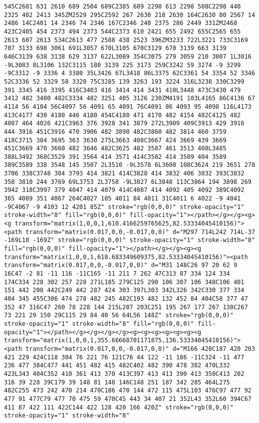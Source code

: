 \documentclass[
]{article}
\begin{document}
\begin{verbatim}
545C2681 631 2610 689 2504 689C2385 689 2298 613 2298 508C2298 440 2325 402 2413 345ZM2529 295C2592 267 2630 218 2630 164C2630 80 2567 14 2486 14C2401 14 2346 74 2346 167C2346 240 2375 286 2449 331ZM2468 423C2405 454 2373 494 2373 544C2373 610 2421 655 2492 655C2565 655 2613 607 2613 534C2613 477 2588 438 2523 396ZM3233 722L3221 733C3169 707 3133 698 3061 691L3057 670L3105 670C3129 670 3139 663 3139 646C3139 638 3138 629 3137 622L3089 354C3075 279 3059 210 3007 1L3016 -9L3083 8L3106 132C3115 180 3139 225 3173 259C3242 59 3274 -9 3299 -9C3312 -9 3336 4 3380 35L3426 67L3418 86L3375 62C3361 54 3354 52 3346 52C3336 52 3329 58 3320 75C3285 139 3263 193 3224 316L3238 330C3299 391 3345 416 3395 416C3403 416 3414 414 3431 410L3448 473C3430 479 3412 482 3400 482C3334 482 3251 405 3126 230ZM4191 103L4165 86C4136 67 4114 56 4104 56C4097 56 4091 65 4091 76C4091 86 4093 95 4098 116L4173 413C4177 430 4180 446 4180 454C4180 471 4170 482 4154 482C4125 482 4087 464 4026 421C3963 376 3928 341 3879 272L3909 409C3913 429 3916 444 3916 451C3916 470 3906 482 3890 482C3860 482 3814 460 3759 418C3715 384 3695 363 3630 275L3663 408C3667 424 3669 439 3669 451C3669 470 3660 482 3646 482C3625 482 3587 461 3513 408L3485 388L3492 368C3529 391 3564 414 3571 414C3582 414 3589 404 3589 389C3589 338 3548 145 3507 2L3510 -9L3578 6L3600 108C3624 219 3651 278 3706 338C3748 384 3793 414 3821 414C3828 414 3832 406 3832 393C3832 358 3810 244 3769 69L3753 2L3758 -9L3827 6L3848 113C3864 194 3898 269 3942 318C3997 379 4047 414 4079 414C4087 414 4092 405 4092 389C4092 365 4089 351 4067 264C4027 105 4011 84 4011 31C4011 6 4022 -9 4041 -9C4067 -9 4103 12 4201 85Z" stroke="rgb(0,0,0)" stroke-opacity="1" stroke-width="8" fill="rgb(0,0,0)" fill-opacity="1"></path></g></g><g><g transform="matrix(1,0,0,1,610.4166259765625,82.53334045410156)"><path transform="matrix(0.017,0,0,-0.017,0,0)" d="M297 714L242 714L-37 -169L18 -169Z" stroke="rgb(0,0,0)" stroke-opacity="1" stroke-width="8" fill="rgb(0,0,0)" fill-opacity="1"></path></g></g><g><g transform="matrix(1,0,0,1,618.683349609375,82.53334045410156)"><path transform="matrix(0.017,0,0,-0.017,0,0)" d="M31 148C26 97 20 62 9 16C47 -2 81 -11 116 -11C165 -11 211 7 262 47C313 87 334 124 334 174C334 228 302 257 228 271L185 279C125 290 106 307 106 348C106 401 151 442 208 442C249 442 287 424 303 397L303 342L326 342C330 377 334 404 345 455C306 474 278 482 245 482C193 482 132 452 84 404C58 377 47 352 47 316C47 260 78 228 144 215L207 203C251 195 267 177 267 138C267 73 221 29 150 29C115 29 84 40 56 64L56 148Z" stroke="rgb(0,0,0)" stroke-opacity="1" stroke-width="8" fill="rgb(0,0,0)" fill-opacity="1"></path></g></g></g></g><g><g><g><g><g><g><g transform="matrix(1,0,0,1,355.66668701171875,136.53334045410156)"><path transform="matrix(0.017,0,0,-0.017,0,0)" d="M166 420C187 420 203 421 229 424C118 304 76 221 76 121C76 44 122 -11 186 -11C324 -11 477 236 477 384C477 441 451 482 415 482C402 482 390 478 382 470L332 423L343 404C352 410 361 413 370 413C397 413 413 390 413 350C413 202 316 39 228 39C179 39 148 81 148 146C148 251 187 342 285 464L275 482C255 473 242 470 214 470C186 470 144 472 115 475L103 476C97 477 92 477 91 477C79 477 70 475 59 470C45 443 34 407 21 352L43 352L60 394C67 411 87 422 111 422C144 422 128 420 166 420Z" stroke="rgb(0,0,0)" stroke-opacity="1" stroke-width="8" 
\end{verbatim}
\end{document}
